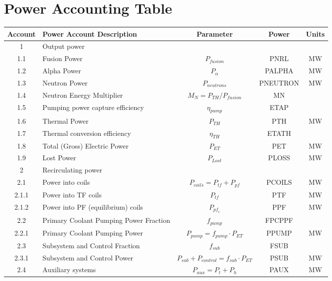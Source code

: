 \newpage
\section{Power Accounting Table}

\begin{table}[ht!]								
\centering								
\begin{tabular}{|c|p{5cm}|c|c|c|}								
\hline								
\textbf{Account}	&	\textbf{Power Account Description}	&	\textbf{Parameter }	&	\textbf{Power}	&	\textbf{Units} \\
\hline								
1	&	Output power	&		&		&	\\
\hline
1.1	&	Fusion Power	&	$P_{{fusion}}$	&	PNRL	&	MW \\
1.2	&	Alpha Power	&	$P_{{\alpha}}$	&	PALPHA	&	MW \\
1.3	&	Neutron Power	&	$P_{{neutrons}}$	&	PNEUTRON	&	MW \\
1.4	&	Neutron Energy Multiplier	&	$M_N = P_{{TH}}/P_{{fusion}}$	&	MN	&	\\
1.5	&	Pumping power capture efficiency	&	$\eta_{{pump}}$	&	ETAP	&	\\
1.6	&	Thermal Power	&	$P_{{TH}}$	&	PTH	&	MW \\
1.7	&	Thermal conversion efficiency	&	$\eta_{{TH}}$	&	ETATH	&	\\
1.8	&	Total (Gross) Electric Power	&	$P_{{ET}}$	&	PET	&	MW \\
1.9	&	Lost Power	&	$P_{{Lost}}$	&	PLOSS	&	MW \\
\hline								
2	&	Recirculating power	&		&		&	\\
\hline
2.1	&	Power into coils 	&	$P_{{coils}} = P_{{tf}} + P_{{pf}}$	&	PCOILS	&	MW \\
2.1.1	&	Power into TF coils	&	$P_{{tf}}$	&	PTF	&	MW \\
2.1.2	&	Power into PF (equilibrium) coils	&	$P_{{pf}_e}$	&	PPF		&	MW \\
2.2	&	Primary Coolant Pumping Power Fraction	&	$f_{{pump}}$	&	FPCPPF &	\\
2.2.1	&	Primary Coolant Pumping Power	&	$P_{{pump}} = f_{{pump}} \cdot P_{{ET}}$	&	PPUMP	&	MW \\
2.3	&	Subsystem and Control Fraction	&	$f_{{sub}}$	&	FSUB	&	\\
2.3.1	&	Subsystem and Control Power	&	$P_{{sub}} + P_{{control}} = f_{{sub}} \cdot P_{{ET}}$	&	PSUB	&	MW \\
2.4	&	Auxiliary systems	&	$P_{{aux}} = P_{{t}} + P_{{h}}$	&	PAUX	&	MW \\

\end{tabular}
\end{table}
